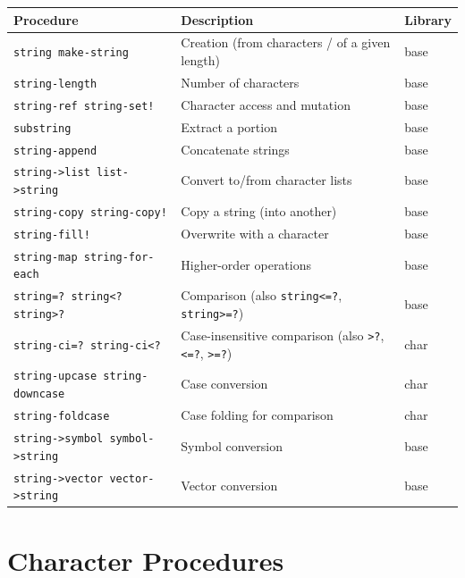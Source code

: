 \begin{center}
\small
\begin{tabularx}{\textwidth}{@{}lYl@{}}
\textbf{Procedure} & \textbf{Description} & \textbf{Library} \\
\hline
\texttt{string make-string} & Creation (from characters / of a given length) & base \\
\texttt{string-length} & Number of characters & base \\
\texttt{string-ref string-set!} & Character access and mutation & base \\
\texttt{substring} & Extract a portion & base \\
\texttt{string-append} & Concatenate strings & base \\
\texttt{string->list list->string} & Convert to/from character lists & base \\
\texttt{string-copy string-copy!} & Copy a string (into another) & base \\
\texttt{string-fill!} & Overwrite with a character & base \\
\texttt{string-map string-for-each} & Higher-order operations & base \\
\texttt{string=? string<? string>?} & Comparison (also \texttt{string<=?}, \texttt{string>=?}) & base \\
\texttt{string-ci=? string-ci<?} & Case-insensitive comparison (also \texttt{>?}, \texttt{<=?}, \texttt{>=?}) & char \\
\texttt{string-upcase string-downcase} & Case conversion & char \\
\texttt{string-foldcase} & Case folding for comparison & char \\
\texttt{string->symbol symbol->string} & Symbol conversion & base \\
\texttt{string->vector vector->string} & Vector conversion & base \\
\end{tabularx}
\end{center}

\section{Character Procedures}

